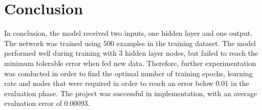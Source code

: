\section*{Conclusion}
In conclusion, the model received two inputs, one hidden layer and one output. The network was trained using 500 examples in the training dataset. The model performed well during training with 3 hidden layer nodes, but failed to reach the minimum tolerable error when fed new data. Therefore, further experimentation was conducted in order to find the optimal number of training epochs, learning rate and nodes that were required in order to reach an error below 0.01 in the evaluation phase. The project was successful in implementation, with an average evaluation error of 0.00093.
